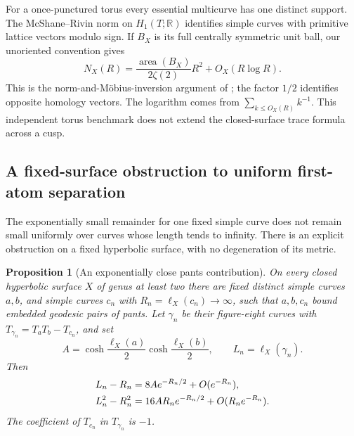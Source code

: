 \documentclass[11pt,a4paper]{article}
\numberwithin{equation}{section}
\newtheorem{proposition}[theorem]{Proposition}
\theoremstyle{definition}
\theoremstyle{remark}
\newcommand{\RR}{\mathbb R}
\begin{document}
For a once-punctured torus every essential multicurve has one
distinct support.  The McShane--Rivin norm on $H_1(T;\RR)$ identifies
simple curves with primitive lattice vectors modulo sign.  If $B_X$
is its full centrally symmetric unit ball, our unoriented convention
gives
\begin{equation}
 N_X(R)=\frac{\operatorname{area}(B_X)}{2\zeta(2)}R^2
                  +O_X(R\log R).
 \label{eq:counttorus}
\end{equation}
This is the norm-and-M\"obius-inversion argument of
\cite[Theorem 4.1]{McShaneRivinTori}; the factor $1/2$ identifies
opposite homology vectors.  The logarithm comes from
$\sum_{k\leq O_X(R)}k^{-1}$.  This independent torus benchmark does
not extend the closed-surface trace formula across a cusp.


\subsection{A fixed-surface obstruction to uniform first-atom separation}
\label{subsec:countnearcollision}

The exponentially small remainder for one fixed simple curve does not
remain small uniformly over curves whose length tends to infinity.
There is an explicit obstruction on a fixed hyperbolic surface, with
no degeneration of its metric.

\begin{proposition}[An exponentially close pants contribution]
\label{prop:countnearcollision}
On every closed hyperbolic surface $X$ of genus at least two there
are fixed distinct simple curves $a,b$, and simple curves $c_n$
with $R_n=\ell_X(c_n)\to\infty$, such that $a,b,c_n$ bound
embedded geodesic pairs of pants. Let $\gamma_n$ be their
figure-eight curves with
$T_{\gamma_n}=T_aT_b-T_{c_n}$, and set
\[
 A=\cosh\frac{\ell_X(a)}2\cosh\frac{\ell_X(b)}2,
 \qquad L_n=\ell_X(\gamma_n).
\]
Then
\begin{align}
 L_n-R_n&=8A e^{-R_n/2}+O(e^{-R_n}),\notag\\
 L_n^2-R_n^2&=16A R_n e^{-R_n/2}
                    +O(R_n e^{-R_n}).
 \label{eq:countpantsgap}
\end{align}
The coefficient of $T_{c_n}$ in $T_{\gamma_n}$ is $-1$.
\end{proposition}
\end{document}

